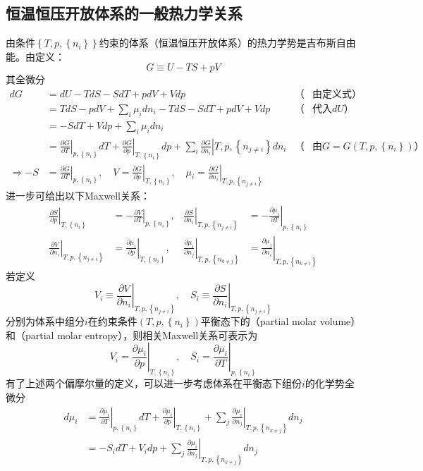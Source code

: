 \documentclass[main.tex]{subfiles}
\begin{document}
\subsection{恒温恒压开放体系的一般热力学关系}
由条件$\left\{T,p,\left\{n_i\right\}\right\}$约束的体系（恒温恒压开放体系）的热力学势是吉布斯自由能。由定义：
\[G\equiv U-TS+pV\]
其全微分
\begin{align*}
dG&=dU-TdS-SdT+pdV+Vdp&\text{（}&\text{由定义式）}\\
&=TdS-pdV+\sum_i\mu_idn_i-TdS-SdT+pdV+Vdp&\text{（}&\text{代入$dU$）}\\
&=-SdT+Vdp+\sum_i\mu_idn_i\\
&=\left.\frac{\partial G}{\partial T}\right|_{p,\left\{n_i\right\}}dT+\left.\frac{\partial G}{\partial p}\right|_{T,\left\{n_i\right\}}dp+\sum_i\left.\frac{\partial G}{\partial n_i}\right|{T,p,\left\{n_{j\neq i}\right\}}dn_i&\text{（}&\text{由$G=G\left(T,p,\left\{n_i\right\}\right)$）}\\
\Rightarrow -S&=\left.\frac{\partial G}{\partial T}\right|_{p,\left\{n_i\right\}},\quad V=\left.\frac{\partial G}{\partial p}\right|_{T,\left\{n_i\right\}},\quad\mu_i=\left.\frac{\partial G}{\partial n_i}\right|_{T,p,\left\{n_{j\neq i}\right\}}
\end{align*}
进一步可给出以下Maxwell关系：
\begin{align*}
\left.\frac{\partial S}{\partial p}\right|_{T,\left\{n_i\right\}}&=-\left.\frac{\partial V}{\partial T}\right|_{p,\left\{n_i\right\}},&\left.\frac{\partial S}{\partial n_i}\right|_{T,p,\left\{n_{j\neq i}\right\}}&=-\left.\frac{\partial\mu_i}{\partial T}\right|_{p,\left\{n_i\right\}}\\
\left.\frac{\partial V}{\partial n_i}\right|_{T,p,\left\{n_{j\neq i}\right\}}&=\left.\frac{\partial \mu_i}{\partial p}\right|_{T,\left\{n_i\right\}},&\left.\frac{\partial\mu_i}{\partial n_j}\right|_{T,p,\left\{n_{k\neq j}\right\}}&=\left.\frac{\partial\mu_j}{\partial n_i}\right|_{T,p,\left\{n_{k\neq i}\right\}}
\end{align*}
若定义
\[V_i\equiv\left.\frac{\partial V}{\partial n_i}\right|_{T,p,\left\{n_{j\neq i}\right\}},\quad S_i\equiv\left.\frac{\partial S}{\partial n_i}\right|_{T,p,\left\{n_{j\neq i}\right\}}\]
分别为体系中组分$i$在约束条件$\left(T,p,\left\{n_i\right\}\right)$平衡态下的（partial molar volume）和（partial molar entropy），则相关Maxwell关系可表示为
\[V_i=\left.\frac{\partial\mu_i}{\partial p}\right|_{T,\left\{n_i\right\}},\quad S_i=\left.\frac{\partial\mu_i}{\partial T}\right|_{p,\left\{n_i\right\}}\]
有了上述两个偏摩尔量的定义，可以进一步考虑体系在平衡态下组份$i$的化学势全微分
\begin{align*}
d\mu_i&=\left.\frac{\partial\mu_i}{\partial T}\right|_{p,\left\{n_i\right\}}dT+\left.\frac{\partial\mu_i}{\partial p}\right|_{T,\left\{n_i\right\}}+\sum_j\left.\frac{\partial\mu_i}{\partial n_j}\right|_{T,p,\left\{n_{k\neq j}\right\}}dn_j\\
&=-S_idT+V_idp+\sum_j\left.\frac{\partial\mu_i}{\partial n_j}\right|_{T,p,\left\{n_{k\neq j}\right\}}dn_j
\end{align*}
\end{document}

